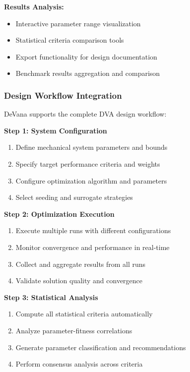 \documentclass[12pt,a4paper]{article}
\newcommand{\softwareName}{DeVana}
\begin{document}
\textbf{Results Analysis:}
\begin{itemize}
    \item Interactive parameter range visualization
    \item Statistical criteria comparison tools
    \item Export functionality for design documentation
    \item Benchmark results aggregation and comparison
\end{itemize}

\subsubsection{Design Workflow Integration}

\softwareName{} supports the complete DVA design workflow:

\textbf{Step 1: System Configuration}
\begin{enumerate}
    \item Define mechanical system parameters and bounds
    \item Specify target performance criteria and weights
    \item Configure optimization algorithm and parameters
    \item Select seeding and surrogate strategies
\end{enumerate}

\textbf{Step 2: Optimization Execution}
\begin{enumerate}
    \item Execute multiple runs with different configurations
    \item Monitor convergence and performance in real-time
    \item Collect and aggregate results from all runs
    \item Validate solution quality and convergence
\end{enumerate}

\textbf{Step 3: Statistical Analysis}
\begin{enumerate}
    \item Compute all statistical criteria automatically
    \item Analyze parameter-fitness correlations
    \item Generate parameter classification and recommendations
    \item Perform consensus analysis across criteria
\end{enumerate}
\end{document}
